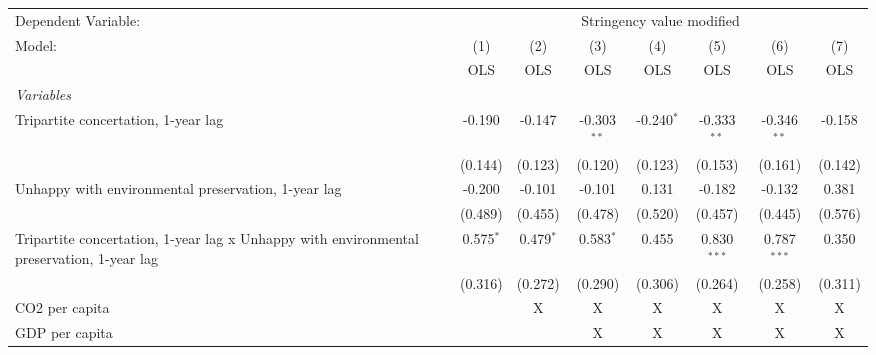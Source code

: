 
\begingroup
\centering
\begin{tabular}{lccccccc}
   \toprule
   Dependent Variable: & \multicolumn{7}{c}{Stringency value modified}\\
   Model:                                                                                    & (1)         & (2)         & (3)           & (4)          & (5)           & (6)           & (7)\\  
                                                                                             &  OLS        & OLS         & OLS           & OLS          & OLS           & OLS           & OLS\\  
   \midrule
   \emph{Variables}\\
   Tripartite concertation, 1-year lag                                                       & -0.190      & -0.147      & -0.303$^{**}$ & -0.240$^{*}$ & -0.333$^{**}$ & -0.346$^{**}$ & -0.158\\   
                                                                                             & (0.144)     & (0.123)     & (0.120)       & (0.123)      & (0.153)       & (0.161)       & (0.142)\\   
   Unhappy with environmental preservation, 1-year lag                                       & -0.200      & -0.101      & -0.101        & 0.131        & -0.182        & -0.132        & 0.381\\   
                                                                                             & (0.489)     & (0.455)     & (0.478)       & (0.520)      & (0.457)       & (0.445)       & (0.576)\\   
   Tripartite concertation, 1-year lag x Unhappy with environmental preservation, 1-year lag & 0.575$^{*}$ & 0.479$^{*}$ & 0.583$^{*}$   & 0.455        & 0.830$^{***}$ & 0.787$^{***}$ & 0.350\\   
                                                                                             & (0.316)     & (0.272)     & (0.290)       & (0.306)      & (0.264)       & (0.258)       & (0.311)\\   
   CO2 per capita                                                                            &             & X           & X             & X            & X             & X             & X\\  
   GDP per capita                                                                            &             &             & X             & X            & X             & X             & X\\  

\end{tabular}
